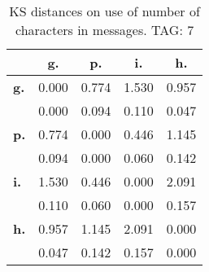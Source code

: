 \begin{table}[h!]
\begin{center}
\begin{tabular}{| l || c | c | c | c |}\hline
 & {\bf g.} & {\bf p.} & {\bf i.} & {\bf h.} \\\hline\hline
{\bf g.} & 0.000 & 0.774 & 1.530 & 0.957 \\
{\bf } & 0.000 & 0.094 & 0.110 & 0.047 \\\hline
{\bf p.} & 0.774 & 0.000 & 0.446 & 1.145 \\
{\bf } & 0.094 & 0.000 & 0.060 & 0.142 \\\hline
{\bf i.} & 1.530 & 0.446 & 0.000 & 2.091 \\
{\bf } & 0.110 & 0.060 & 0.000 & 0.157 \\\hline
{\bf h.} & 0.957 & 1.145 & 2.091 & 0.000 \\
{\bf } & 0.047 & 0.142 & 0.157 & 0.000 \\\hline
\end{tabular}
\caption{KS distances on use of number of characters in messages. TAG: 7}
\end{center}
\end{table}